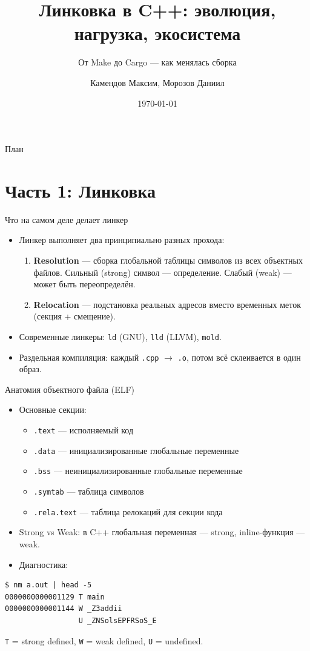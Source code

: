 \documentclass{beamer}
\author{Камендов Максим, Морозов Даниил}
\title{Линковка в C++: эволюция, нагрузка, экосистема}
\subtitle{От Make до Cargo — как менялась сборка}
\institute{C++ Семинар}
\date{\today}
\begin{document}
\begin{frame}
\titlepage
\end{frame}

\begin{frame}{План}
\tableofcontents
\end{frame}

\section{Часть 1: Линковка}

\begin{frame}{Что на самом деле делает линкер}
\begin{itemize}
\item Линкер выполняет два принципиально разных прохода:
\begin{enumerate}
\item \textbf{Resolution} — сборка глобальной таблицы символов из всех объектных файлов.
Сильный (strong) символ — определение. Слабый (weak) — может быть переопределён.
\item \textbf{Relocation} — подстановка реальных адресов вместо временных меток
(секция + смещение).
\end{enumerate}
\item Современные линкеры: \texttt{ld} (GNU), \texttt{lld} (LLVM), \texttt{mold}.
\item Раздельная компиляция: каждый \texttt{.cpp} $\rightarrow$ \texttt{.o},
потом всё склеивается в один образ.
\end{itemize}
\end{frame}

\begin{frame}[fragile]{Анатомия объектного файла (ELF)}
\begin{itemize}
\item Основные секции:
\begin{itemize}
\item \texttt{.text} — исполняемый код
\item \texttt{.data} — инициализированные глобальные переменные
\item \texttt{.bss} — неинициализированные глобальные переменные
\item \texttt{.symtab} — таблица символов
\item \texttt{.rela.text} — таблица релокаций для секции кода
\end{itemize}
\item Strong vs Weak: в C++ глобальная переменная — strong, inline-функция — weak.
\item Диагностика:
\end{itemize}
\begin{lstlisting}
$ nm a.out | head -5
0000000000001129 T main
0000000000001144 W _Z3addii
                 U _ZNSolsEPFRSoS_E
\end{lstlisting}
\vspace{-0.3em}
\texttt{T} = strong defined, \texttt{W} = weak defined, \texttt{U} = undefined.
\end{frame}
\end{document}
